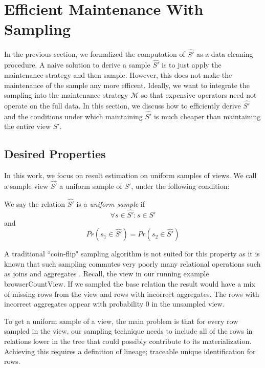\section{Efficient Maintenance With Sampling}
In the previous section, we formalized the computation of $\hat{S'}$  as a data cleaning procedure.
A naive solution to derive a sample $\hat{S'}$ is to just apply the maintenance strategy and then sample.
However, this does not make the maintenance of the sample any more efficent.
Ideally, we want to integrate the sampling into the maintenance strategy $\mathcal{M}$ so that expensive operators
need not operate on the full data.
In this section, we discuss how to efficiently derive $\hat{S'}$ and the conditions under which
maintaining $\hat{S'}$ is much cheaper than maintaining the entire view $S'$.

\subsection{Desired Properties}
In this work, we focus on result estimation on uniform samples of views.
We call a sample view $\hat{S'}$ a uniform sample of $S'$, under the following condition:
\begin{definition} We say the relation $\hat{S'}$ is a \emph{uniform sample} if
\[ \forall s \in \hat{S'} : s \in S' \]
and
\[Pr(s_1 \in \hat{S'}) =  Pr(s_2 \in \hat{S'}) \]
\end{definition}
A traditional ``coin-flip" sampling algorithm is not suited for this property as it is known that such sampling commutes very poorly many relational operations such as joins and aggregates \cite{chaudhuri1999random}.
Recall, the view in our running example \textsf{browserCountView}. 
If we sampled the base relation the result would have a mix of missing rows from the view and rows with incorrect aggregates.
The rows with incorrect aggregates appear with probability 0 in the unsampled view.

To get a uniform sample of a view, the main problem is that for every row sampled in the view, our sampling technique needs to include all of the rows in relations lower in the tree that could possibly contribute to its materialization.
Achieving this requires a definition of lineage; traceable unique identification for rows.

